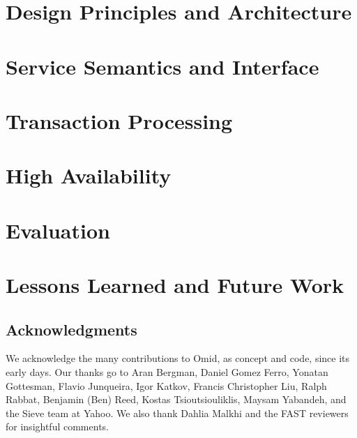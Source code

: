 \documentclass[letterpaper,twocolumn,10pt]{article}
\begin{document}
\section{Design Principles and Architecture}
\label{sec:design}




\section{Service Semantics and Interface}
\label{sec:semantics}


\section{Transaction Processing}
\label{sec:protocol}


\section{High Availability}
\label{sec:ha}


\section{Evaluation}
\label{sec:eval}


\section{Lessons Learned and Future Work}
\label{sec:lessons}




\subsection*{Acknowledgments}

We acknowledge the many contributions to Omid, as concept and code, since its early days. 
Our thanks go to Aran Bergman, Daniel Gomez Ferro, Yonatan Gottesman, Flavio Junqueira, Igor Katkov, Francis Christopher Liu, 
Ralph Rabbat, Benjamin (Ben) Reed, Kostas Tsioutsiouliklis, Maysam Yabandeh, and the Sieve team at Yahoo.  We also thank 
Dahlia Malkhi and the FAST reviewers for insightful comments.


\small
{
}

\end{document}
